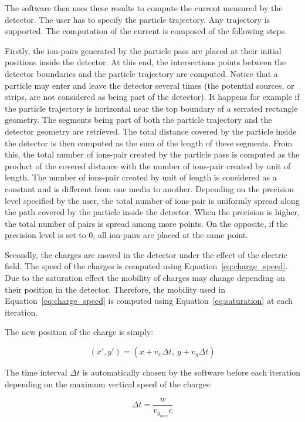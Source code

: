 \documentclass[11pt]{article}
\begin{document}
	The software then uses these results to compute the current measured by the
	detector. The user has to specify the particle trajectory. Any trajectory is
	supported. The computation of the current is composed of the following steps.

	Firstly, the ion-pairs generated by the particle pass are placed at their initial
	positions inside the detector. At this end, the intersections points between the
	detector boundaries and the particle
	trajectory are computed. Notice that a particle may enter and leave the detector
	several times (the potential sources, or strips, are not considered as being
	part of the detector). It happens for example if the particle trajectory is
	horizontal near the top boundary of a serrated rectangle geometry.
	The segments being part of both the particle trajectory and the detector
	geometry are retrieved. The total
	distance covered by the particle inside the detector is then computed as
	the sum of the length of these segments. From this, the total number of ions-pair
	created by the particle pass is computed
	as the product of the covered distance with the number of ions-pair created by unit
	of length. The number of ions-pair created by unit
	of length is considered as a constant and is different from one
	media to another. Depending on the precision level specified by the user, the
	total number of ions-pair
	is uniformly spread along the path covered by the particle inside the
	detector. When the precision is higher, the total number of pairs is spread
	among more points. On the opposite, if the precision level is set to 0,
	all ion-pairs are placed at the same point.


	Secondly, the charges are moved in the detector under the effect of the electric
	field. The speed of the charges is computed using Equation~\ref{eq:charge_speed}.
	Due to the saturation effect the mobility of charges may change depending on
	their position in the detector. Therefore, the mobility used in Equation~\ref{eq:charge_speed}
	is computed using Equation~\ref{eq:saturation} at each iteration.



	The new position of the charge is simply:

	\[(x',y') = (x + v_x \Delta t, \ y + v_y \Delta t)\]

	The time interval $\Delta t$ is automatically chosen by the software before
	each iteration depending on the maximum vertical speed of the charges:

	\[\Delta t = \frac{w}{v_{y_{max}} c}\]
\end{document}
